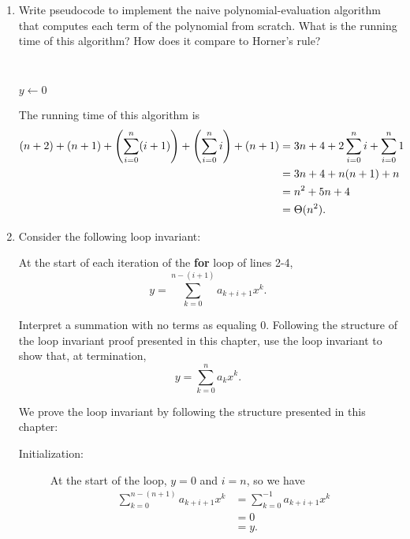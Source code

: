 \documentclass[Chapter02]{subfiles}
\begin{document}
\begin{enumerate}[leftmargin=\labelsep,label={\textbf{\thesection-\arabic*}}]
\begin{enumerate}
			\item Write pseudocode to implement the naive polynomial-evaluation algorithm that computes each term of the polynomial from scratch. What is the running time of this algorithm? How does it compare to Horner's rule?
			\begin{answer}
				\hfill\\
				\begin{algorithm}[H]
					$y \leftarrow 0$\;
				\end{algorithm}

				The running time of this algorithm is
				\begin{align*}
					(n + 2) + (n + 1) + \qty(\sum_{i = 0}^n (i + 1)) + \qty(\sum_{i = 0}^n i) + (n + 1) &= 3n + 4 + 2\sum_{i = 0}^n i + \sum_{i = 0}^n 1\\
						&= 3n + 4 + n(n + 1) + n\\
						&= n^2 + 5n + 4\\
						&= \Theta(n^2).
				\end{align*}
			\end{answer}
			
			\item Consider the following loop invariant: \label{exer:ch02-polynomial-loop-invariant}
			\begin{addmargin}[2em]{2em}
				At the start of each iteration of the \textbf{for} loop of lines 2-4,
				\[
					y = \sum_{k = 0}^{n - (i + 1)} a_{k + i + 1}x^k.
				\]
			\end{addmargin}
			Interpret a summation with no terms as equaling 0. Following the structure of the loop invariant proof presented in this chapter, use the loop invariant to show that, at termination,
			\[
				y = \sum_{k = 0}^n a_kx^k.
			\]
			\begin{answer}
				We prove the loop invariant by following the structure presented in this chapter:
				\begin{description}
					\item[Initialization:] At the start of the loop, $y = 0$ and $i = n$, so we have
					\begin{align*}
						\sum_{k = 0}^{n - (n + 1)} a_{k + i + 1} x^k &= \sum_{k = 0}^{-1} a_{k + i + 1} x^k\\
							&= 0\\
							&= y.
					\end{align*}


\end{description}
\end{answer}
\end{enumerate}
\end{enumerate}
\end{document}

